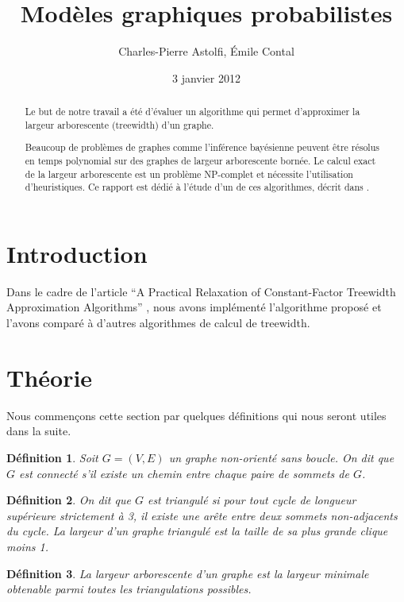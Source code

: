 \documentclass{article}
\title{Modèles graphiques probabilistes}
\author{Charles-Pierre Astolfi, Émile Contal}
\date{3 janvier 2012}
\begin{document}
\newtheorem*{mdef}{Définition}
\newtheorem*{mthm}{Théorème}

\maketitle

\begin{abstract}
Le but de notre travail a été d'évaluer un algorithme qui permet
d'approximer la largeur arborescente (treewidth) d'un graphe.

Beaucoup de problèmes de graphes comme l'inférence bayésienne peuvent
être résolus en temps polynomial sur des graphes de largeur
arborescente bornée. Le calcul exact de la largeur arborescente est un
problème NP-complet et nécessite l'utilisation d'heuristiques. Ce
rapport est dédié à l'étude d'un de ces algorithmes, décrit dans
\cite{rootpaper}.

\end{abstract}

\section{Introduction}
Dans le cadre de l'article ``A Practical Relaxation of Constant-Factor
Treewidth Approximation Algorithms'' \cite{rootpaper}, nous avons
implémenté l'algorithme proposé et l'avons comparé à d'autres
algorithmes de calcul de treewidth.


\section{Théorie}

Nous commençons cette section par quelques définitions qui nous seront
utiles dans la suite.

\begin{mdef}
Soit $G = (V,E)$ un graphe non-orienté sans boucle. On dit que $G$ est
connecté s'il existe un chemin entre chaque paire de sommets de $G$.
\end{mdef}

\begin{mdef}
On dit que $G$ est triangulé si pour tout cycle de longueur supérieure
strictement à 3, il existe une arête entre deux sommets non-adjacents
du cycle. La largeur d'un graphe triangulé est la taille de sa plus
grande clique moins 1.
\end{mdef}

\begin{mdef}
La largeur arborescente d'un graphe est la largeur minimale obtenable
parmi toutes les triangulations possibles.
\end{mdef}
\end{document}
